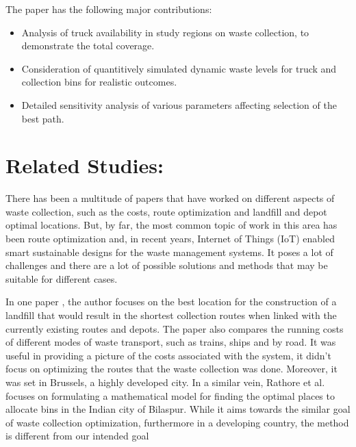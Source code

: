 \documentclass[12pt]{article}
\begin{document}
The paper has the following major contributions:
\begin{itemize}
\item Analysis of truck availability in study regions on waste collection, to demonstrate the total coverage.
\item Consideration of quantitively simulated dynamic waste levels for truck and
collection bins for realistic outcomes.
\item Detailed sensitivity analysis of various parameters affecting selection of the best path.
\end{itemize}

\section{Related Studies:}

There has been a multitude of papers that have worked on different aspects of waste collection, such as the costs, route optimization and landfill and depot optimal locations. But, by far, the most common topic of work in this area has been route optimization and, in recent years, Internet of Things (IoT) enabled smart sustainable designs for the waste management systems. It poses a lot of challenges and there are a lot of possible solutions and methods that may be suitable for different cases. 

In one paper \cite{kulcar1996optimizing}, the author focuses on the best location for the construction of a landfill that would result in the shortest collection routes when linked with the currently existing routes and depots. The paper also compares the running costs of different modes of waste transport, such as trains, ships and by road. It was useful in providing a picture of the costs associated with the system, it didn't focus on optimizing the routes that the waste collection was done. Moreover, it was set in Brussels, a highly developed city. In a similar vein, Rathore et al. \cite{rathore2020location} focuses on formulating a mathematical model for finding the optimal places to allocate bins in the Indian city of Bilaspur. While it aims towards the similar goal of waste collection optimization, furthermore in a developing country, the method is different from our intended goal
\end{document}
